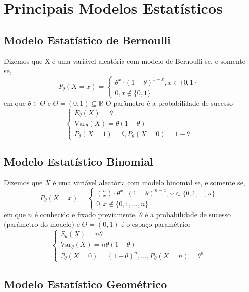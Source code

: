 \documentclass[
  letterpaper,
  DIV=11,
  numbers=noendperiod]{scrreprt}
\begin{document}
\section{Principais Modelos
Estatísticos}\label{principais-modelos-estatuxedsticos}

\subsection{Modelo Estatístico de Bernoulli}\label{sec-modelobernoulli}

Dizemos que X é uma variável aleatória com modelo de Bernoulli se, e
somente se, \[
P_\theta(X=x)=\begin{cases}
\theta^{x} \cdot(1-\theta)^{1-x}, x \in \{0,1 \} \\
0, x \not \in \{0,1 \}
\end{cases}\] em que \(\theta \in \Theta\) e
\(\Theta=(0,1)\subseteq \mathbb{R}\) O parâmetro é a probabilidade de
sucesso \[\begin{cases}
E_\theta(X)=\theta\\
\mathrm{Var}_{\theta}(X) = \theta(1-\theta) \\
P_\theta(X=1)=\theta, P_\theta(X=0)=1-\theta
\end{cases}
\]

\subsection{Modelo Estatístico
Binomial}\label{modelo-estatuxedstico-binomial}

Dizemos que \(X\) é uma variável aleatória com modelo binomial se, e
somente se, \[
P_\theta(X=x)=\begin{cases}
{n \choose x} \cdot \theta^{x}\cdot(1-\theta)^{n-x}, x \in \{0,1,\dots,n \} \\
0, x \not \in \{0,1,\dots,n \}
\end{cases}\] em que \(n\) é conhecido e fixado previamente, \(\theta\)
é a probabilidade de sucesso (parâmetro do modelo) e \(\Theta =(0,1)\) é
o espaço paramétrico \[\begin{cases}
E_\theta(X)=n\theta\\
\mathrm{Var}_{\theta}(X) = n\theta(1-\theta) \\
P_\theta(X=0)=(1-\theta)^{n},\dots, P_\theta(X=n)=\theta^n
\end{cases}\]

\subsection{Modelo Estatístico
Geométrico}\label{modelo-estatuxedstico-geomuxe9trico}
\end{document}
